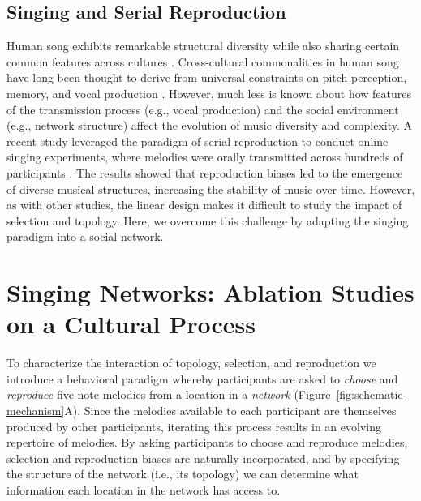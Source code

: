 \documentclass[10pt,letterpaper]{article}
\begin{document}
\subsection{Singing and Serial Reproduction}
Human song exhibits remarkable structural diversity while also sharing certain common features across cultures \cite{mehr2019universality}. 
Cross-cultural commonalities in human song have long been thought to derive from universal constraints on pitch perception, memory, and vocal production \cite{savage2015statistical}. However, much less is known about how features of the transmission process (e.g., vocal production) and the social environment (e.g., network structure) affect the evolution of music diversity and complexity. 
A recent study leveraged the paradigm of serial reproduction to conduct online singing experiments, where melodies were orally transmitted across hundreds of participants \cite{anglada2023large}. The results showed that reproduction biases led to the emergence of diverse musical structures, increasing the stability of music over time. However, as with other studies, the linear design makes it difficult to study the impact of selection and topology. Here, we overcome this challenge by adapting the singing paradigm into a social network.


\section{Singing Networks: Ablation Studies on a Cultural Process}
To characterize the interaction of topology, selection, and reproduction we introduce a behavioral paradigm whereby participants are asked to \emph{choose} and \emph{reproduce} five-note melodies from a location in a \emph{network} (Figure~\ref{fig:schematic-mechanism}A). Since the melodies available to each participant are themselves produced by other participants, iterating this process results in an evolving repertoire of melodies. By asking participants to choose and reproduce melodies, selection and reproduction biases are naturally incorporated, and by specifying the structure of the network (i.e., its topology) we can determine what information each location in the network has access to. 
\end{document}
